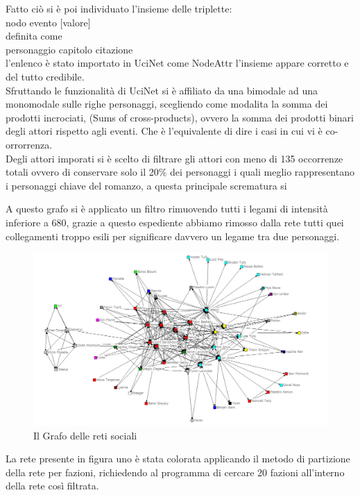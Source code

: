 \documentclass[a4paper]{article}
\begin{document}
Fatto ciò si è poi individuato l'insieme delle triplette:\\
nodo evento [valore]\\
definita come\\
personaggio capitolo citazione\\
l'enlenco è stato importato in UciNet come NodeAttr l'insieme appare corretto e del tutto credibile.\\


Sfruttando le funzionalità di UciNet si è affiliato da una bimodale ad una monomodale sulle righe personaggi, scegliendo come modalita la somma dei prodotti incrociati, (Sums of cross-products), ovvero la somma dei prodotti binari degli attori rispetto agli eventi. Che è l'equivalente di dire i casi in cui vi è co-orrorrenza.\\

Degli attori imporati si è scelto di filtrare gli attori con meno di 135 occorrenze totali ovvero di conservare solo il 20\% dei personaggi i quali meglio rappresentano i personaggi chiave del romanzo, a questa principale scrematura si 

A questo grafo si è applicato un filtro rimuovendo tutti i legami di intensità inferiore a 680, grazie a questo espediente abbiamo rimosso dalla rete tutti quei collegamenti troppo esili per significare davvero un legame tra due personaggi. 
\begin{figure}[h]
\centering
\includegraphics[width=.9\textwidth]{picture/029.png}
\caption{Il Grafo delle reti sociali}
\label{fig:grafo-partito}
\end{figure}
La rete presente in figura uno è stata colorata applicando il metodo di partizione della rete per fazioni, richiedendo al programma di cercare 20 fazioni all'interno della rete così filtrata.\\
\end{document}
